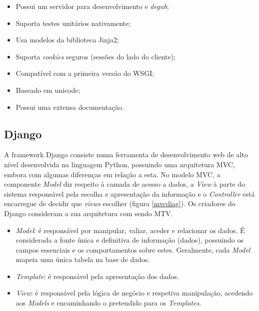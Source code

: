 \begin{itemize}
	\item Possui um servidor para desenvolvimento e \textit{degub}; 
	\item Suporta testes unitários nativamente; 
	\item Usa modelos da biblioteca Jinja2; 
	\item Suporta \textit{cookies} seguros (sessões do lado do cliente); 
	\item Compatível com a primeira versão do \ac{WSGI}; 
	\item Baseado em unicode; 
	\item Possui uma extensa documentação.
\end{itemize}




\subsection{Django}


A framework Django consiste numa ferramenta de desenvolvimento web de alto nível desenvolvida na linguagem Python, possuindo uma arquitetura \ac{MVC}\cite{Deacon2005}, embora com algumas diferenças em relação a esta. No modelo \ac{MVC}, a componente \textit{Model} diz respeito à camada de acesso a dados, a \textit{View} à parte do sistema responsável pela escolha e apresentação da informação e o \textit{Controller} está encarregue de decidir que \textit{views} escolher (figura \ref{mvcdiag}). Os criadores do Django consideram a sua arquitetura com sendo \ac{MTV}\cite{Index}. 

\begin{itemize}
	\item \textit{Model}: é responsável por manipular, valiar, aceder e relacionar os dados. É considerada a fonte única e definitiva de informação (dados), possuindo os campos essenciais e os comportamentos sobre estes. Geralmente, cada \textit{Model} mapeia uma única tabela na base de dados. 
	
	
	\item \textit{Template}: é responsável pela apresentação dos dados. 

	\item \textit{View}: é responsável pela lógica de negócio e respetiva manipulação, acedendo aos \textit{Models} e encaminhando o pretendido para os \textit{Templates}. 
	
\end{itemize}

